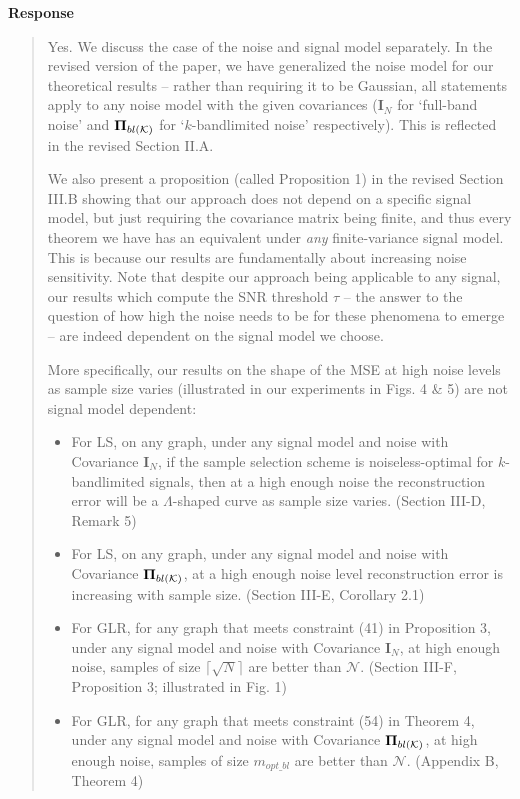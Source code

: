 \documentclass[11pt,onecolumn,journal]{IEEEtran}
\newcommand{\matr}[1]{\bm{#1}}
\theoremstyle{definition}
\newcommand{\set}[1]{\mathcal{#1}}
\begin{document}
\textbf{Response}
\begin{quote}
Yes. We discuss the case of the noise and signal model separately. In the revised version of the paper, we have generalized the noise model for our theoretical results -- rather than requiring it to be Gaussian, all statements apply to any noise model with the given covariances ($\matr{I}_{N}$ for `full-band noise' and $\projbl$ for `$k$-bandlimited noise' respectively). This is reflected in the revised Section II.A. %

We also present a proposition (called Proposition 1) in the revised Section III.B showing that our approach does not depend on a specific signal model, but just requiring the covariance matrix being finite, and thus every theorem we have has an equivalent under \emph{any} finite-variance signal model. This is because our results are fundamentally about increasing noise sensitivity. 
Note that despite our approach being applicable to any signal, our results which compute the SNR threshold $\tau$ -- the answer to the question of how high the noise needs to be for these phenomena to emerge -- are indeed dependent on the signal model we choose.

More specifically, our results on the shape of the MSE at high noise levels as sample size varies (illustrated in our experiments in Figs. 4 \& 5) are not signal model dependent: 
\begin{itemize}
    \item For LS, on any graph, under any signal model and noise with Covariance $\matr{I}_{N}$, if the sample selection scheme is noiseless-optimal for $k$-bandlimited signals, then at a high enough noise the reconstruction error will be a $\Lambda$-shaped curve as sample size varies. (Section III-D, Remark 5)
    \item For LS, on any graph, under any signal model and noise with Covariance $\projbl$, at a high enough noise level reconstruction error is increasing with sample size. (Section III-E, Corollary 2.1)
    \item For GLR, for any graph that meets constraint (41) in Proposition 3, under any signal model and noise with Covariance $\matr{I}_{N}$, at high enough noise, samples of size $\lceil\sqrt{N}\rceil$ are better than $\set{N}$. (Section III-F, Proposition 3; illustrated in Fig. 1)
    \item For GLR, for any graph that meets constraint (54) in Theorem 4, under any signal model and noise with Covariance $\projbl$, at high enough noise, samples of size $m_{opt\_bl}$ are better than $\set{N}$. (Appendix B, Theorem 4)
\end{itemize}


\end{quote}
\end{document}
